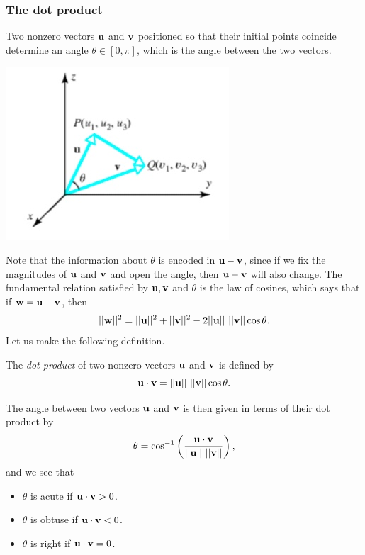 \documentclass[12pt,letterpaper,reqno]{article}
\numberwithin{equation}{section}
\begin{document}
\subsubsection{The dot product}
Two nonzero vectors ${\bf u}$ and ${\bf v}$ positioned so that their initial points coincide determine an angle $\theta \in [0,\pi]$, which is the angle between the two vectors.
\begin{center}
	\includegraphics[scale=0.5]{figures_mvc/angle_uv}
\end{center}
Note that the information about $\theta$ is encoded in ${\bf u}-{\bf v}$, since if we fix the magnitudes of ${\bf u}$ and ${\bf v}$ and open the angle, then ${\bf u}-{\bf v}$ will also change. The fundamental relation satisfied by ${\bf u}, {\bf v}$ and $\theta$ is the law of cosines, which says that if ${\bf w}={\bf u}-{\bf v}$, then
\begin{equation}\label{eq:law_of_cosines}
	||{\bf w}||^2=||{\bf u}||^2+||{\bf v}||^2-2||{\bf u}|| \ ||{\bf v}||\cos \theta. 
\end{equation}
Let us make the following definition.
\begin{defn}
	The \emph{dot product} of two nonzero vectors ${\bf u}$ and ${\bf v}$ is defined by
	\begin{equation}\label{eq:dot_product_def}
		{\bf u}\cdot {\bf v}=||{\bf u}|| \ ||{\bf v}||\cos\theta.
	\end{equation} 
\end{defn}
The angle between two vectors ${\bf u}$ and ${\bf v}$ is then given in terms of their dot product by
\begin{equation}\label{eq:angle_uv}
	\theta=\cos^{-1}\left(\frac{{\bf u}\cdot {\bf v}}{||{\bf u}|| \ ||{\bf v}||}\right),
\end{equation}	
and we see that
\begin{itemize}
	\item $\theta$ is acute if ${\bf u} \cdot {\bf v} > 0$.
	\item $\theta$ is obtuse if ${\bf u} \cdot {\bf v} < 0$.
	\item $\theta$ is right if ${\bf u} \cdot {\bf v} = 0$.
\end{itemize}
\end{document}
